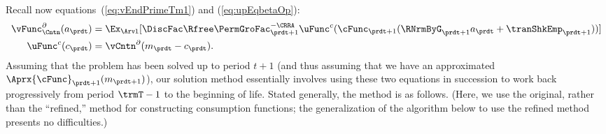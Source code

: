 Recall now equations~(\ref{eq:vEndPrimeTm1}) and (\ref{eq:upEqbetaOp}):
\begin{equation*}\begin{gathered}\begin{aligned}
      \vFunc^{\partial}_{\Cntn}(a_{\prdt})  & = \Ex_{\Arvl}[\DiscFac \Rfree \PermGroFac_{\prdt+1}^{-\CRRA}
      \uFunc^{c}(\cFunc_{\prdt+1}(\RNrmByG_{\prdt+1} a_{\prdt}+{\tranShkEmp}_{\prdt+1}))]
      \\\uFunc^{c}(c_{\prdt})   & = \vCntn^{\partial}(m_{\prdt}-c_{\prdt}).
    \end{aligned}\end{gathered}\end{equation*}
Assuming that the problem has been solved up to period $t+1$ (and thus assuming that we have an approximated $\Aprx{\cFunc}_{\prdt+1}(m_{\prdt+1})$), our solution method essentially involves using these two equations in succession to work back progressively from period $\trmT-1$ to the beginning of life.  Stated generally, the method is as follows.  (Here, we use the original, rather than the ``refined,'' method for constructing consumption functions; the generalization of the algorithm below to use the refined method presents no difficulties.)

